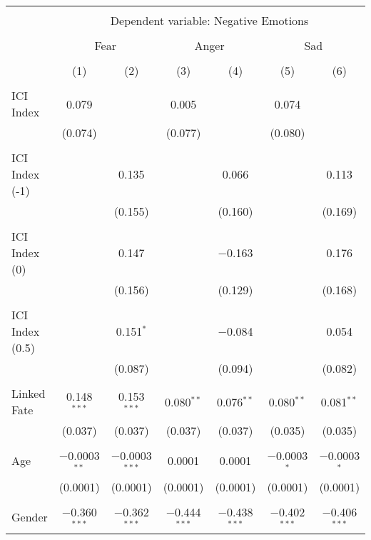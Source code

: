 
\begin{table}[!htbp] \centering 
  \caption{} 
  \label{} 
\begin{tabular}{@{\extracolsep{5pt}}lcccccc} 
\\[-1.8ex]\hline 
\hline \\[-1.8ex] 
 & \multicolumn{6}{c}{Dependent variable: Negative Emotions} \\ 
\cline{2-7} 
\\[-1.8ex] & \multicolumn{2}{c}{Fear} & \multicolumn{2}{c}{Anger} & \multicolumn{2}{c}{Sad} \\ 
\\[-1.8ex] & (1) & (2) & (3) & (4) & (5) & (6)\\ 
\hline \\[-1.8ex] 
 ICI Index & 0.079 &  & 0.005 &  & 0.074 &  \\ 
  & (0.074) &  & (0.077) &  & (0.080) &  \\ 
  & & & & & & \\ 
 ICI Index (-1) &  & 0.135 &  & 0.066 &  & 0.113 \\ 
  &  & (0.155) &  & (0.160) &  & (0.169) \\ 
  & & & & & & \\ 
 ICI Index (0) &  & 0.147 &  & $-$0.163 &  & 0.176 \\ 
  &  & (0.156) &  & (0.129) &  & (0.168) \\ 
  & & & & & & \\ 
 ICI Index (0.5) &  & 0.151$^{*}$ &  & $-$0.084 &  & 0.054 \\ 
  &  & (0.087) &  & (0.094) &  & (0.082) \\ 
  & & & & & & \\ 
 Linked Fate & 0.148$^{***}$ & 0.153$^{***}$ & 0.080$^{**}$ & 0.076$^{**}$ & 0.080$^{**}$ & 0.081$^{**}$ \\ 
  & (0.037) & (0.037) & (0.037) & (0.037) & (0.035) & (0.035) \\ 
  & & & & & & \\ 
 Age & $-$0.0003$^{**}$ & $-$0.0003$^{***}$ & 0.0001 & 0.0001 & $-$0.0003$^{*}$ & $-$0.0003$^{*}$ \\ 
  & (0.0001) & (0.0001) & (0.0001) & (0.0001) & (0.0001) & (0.0001) \\ 
  & & & & & & \\ 
 Gender & $-$0.360$^{***}$ & $-$0.362$^{***}$ & $-$0.444$^{***}$ & $-$0.438$^{***}$ & $-$0.402$^{***}$ & $-$0.406$^{***}$ \\ 

\end{tabular}
\end{table}
